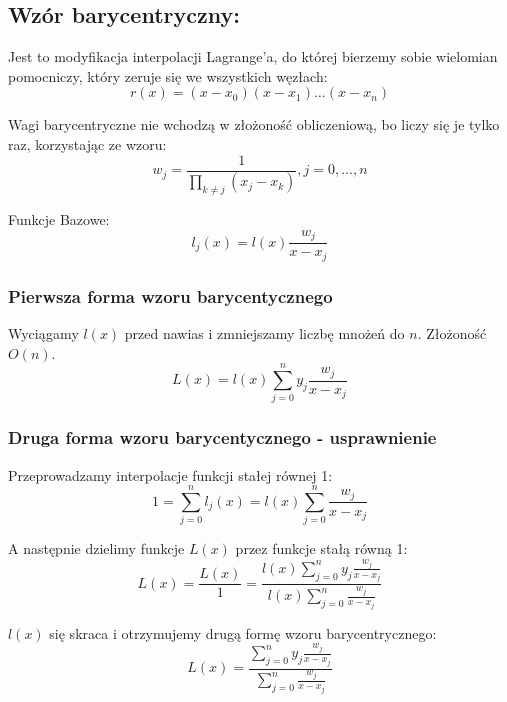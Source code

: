 \documentclass[a4paper]{article}
\begin{document}
\subsection{Wzór barycentryczny:}
Jest to modyfikacja interpolacji Lagrange’a, do której bierzemy sobie wielomian pomocniczy, który zeruje się we wszystkich węzłach:
\begin{equation*}
    r(x)=(x-x_0)(x-x_1)\ldots(x-x_n)
\end{equation*}

Wagi barycentryczne nie wchodzą w złożoność obliczeniową, bo liczy się je tylko raz, korzystając ze wzoru:
\begin{equation*}
    w_j=\frac{1}{\prod_{k\neq j}(x_j-x_k)},j=0,\ldots,n
\end{equation*}

Funkcje Bazowe:
\begin{equation*}
    l_j(x)=l(x)\frac{w_j}{x-x_j}
\end{equation*}

\subsubsection{Pierwsza forma wzoru barycentycznego}
Wyciągamy $l(x)$ przed nawias i zmniejszamy liczbę mnożeń do $n$. Złożoność $O(n)$.
\begin{equation*}
    L(x)=l(x)\sum_{j=0}^{n}{y_j\frac{w_j}{x-x_j}}
\end{equation*}

\subsubsection{Druga forma wzoru barycentycznego - usprawnienie}
Przeprowadzamy interpolacje funkcji stałej równej 1:
\begin{equation*}
    1=\sum_{j=0}^{n}{l_j(x)}=l(x)\sum_{j=0}^{n}\frac{w_j}{x-x_j}
\end{equation*}

A następnie dzielimy funkcje $L(x)$ przez funkcje stałą równą 1:
\begin{equation*}
    L(x)=\frac{L(x)}{1}=\frac{l(x)\sum_{j=0}^{n}{y_j\frac{w_j}{x-x_j}}}{l(x)\sum_{j=0}^{n}\frac{w_j}{x-x_j}}
\end{equation*}

$l(x)$  się skraca i otrzymujemy drugą formę wzoru barycentrycznego:
\begin{equation*}
    L(x)=\frac{\sum_{j=0}^{n}{y_j\frac{w_j}{x-x_j}}}{\sum_{j=0}^{n}\frac{w_j}{x-x_j}}
\end{equation*}
\end{document}
